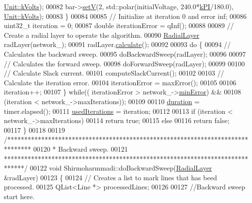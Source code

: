 \begin{DoxyCode}
      \hyperlink{class_unit_a55b07dfa9457e1eca2c7194fe0cfc3c1aa54b2473993a702a3923525765bd6e4c}{Unit::kVolts});
00082     bar->\hyperlink{group___models_ga8d1e70b2d11ed4245e81b8b20858079d}{setV}(2, std::polar(initialVoltage, 240.0*\hyperlink{math__constants_8h_a368d99984512d9a6c6f18b37b4446431}{kPI}/180.0), 
      \hyperlink{class_unit_a55b07dfa9457e1eca2c7194fe0cfc3c1aa54b2473993a702a3923525765bd6e4c}{Unit::kVolts});
00083   \}
00084 
00085   \textcolor{comment}{// Initialize at iteration 0 and error inf;}
00086   uint32\_t iteration = 0;
00087   \textcolor{keywordtype}{double} iterationError = qInf();
00088 
00089   \textcolor{comment}{// Create a radial layer to operate the algorithm.}
00090   \hyperlink{class_radial_layer}{RadialLayer} radLayer(network\_);
00091   radLayer.\hyperlink{class_radial_layer_a971680f24ba6c516afedbc49d8c22cab}{calculate}();
00092 
00093   \textcolor{keywordflow}{do} \{
00094     \textcolor{comment}{// Calculates the backward sweep.}
00095     doBackwardSweep(radLayer);
00096 
00097     \textcolor{comment}{// Calculates the forward sweep.}
00098     doForwardSweep(radLayer);
00099 
00100     \textcolor{comment}{// Calculate Slack current.}
00101     computeSlackCurrent();
00102 
00103     \textcolor{comment}{// Calculate the iteration error.}
00104     iterationError = maxError();
00105 
00106     iteration++;
00107   \} \textcolor{keywordflow}{while}(( iterationError > network\_->\hyperlink{group___models_gabcdc973129d3dda7572b7a1c388da1b5}{minError}) &&
00108           (iteration < network\_->maxIterations));
00109 
00110   \hyperlink{class_shirmoharmmadi_a32ab19ff485833106bf68cd91dbc94e6}{duration} = timer.elapsed();
00111   \hyperlink{class_shirmoharmmadi_afdd22da0145b033c47f4f8a6bbd37d0d}{usedIterations} = iteration;
00112 
00113   \textcolor{keywordflow}{if} (iteration < network\_->maxIterations)
00114     \textcolor{keywordflow}{return} \textcolor{keyword}{true};
00115   \textcolor{keywordflow}{else}
00116     \textcolor{keywordflow}{return} \textcolor{keyword}{false};
00117 \}
00118 
00119 \textcolor{comment}{/*******************************************************************************}
00120 \textcolor{comment}{ * Backward sweep.}
00121 \textcolor{comment}{ ******************************************************************************/}
00122 \textcolor{keywordtype}{void} Shirmoharmmadi::doBackwardSweep(\hyperlink{class_radial_layer}{RadialLayer} &radLayer)
00123 \{
00124   \textcolor{comment}{// Creates a list to mark lines that has beed processed.}
00125   QList<Line *> processedLines;
00126 
00127   \textcolor{comment}{//Backward sweep start here.}

\end{DoxyCode}
